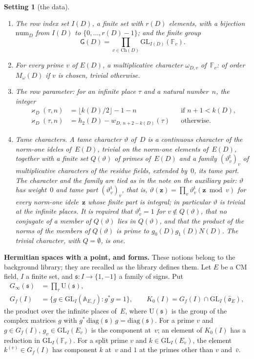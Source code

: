 \documentclass[11pt,a4paper]{article}
\newcommand{\F}{\mathbb{F}}
\newcommand{\m}[1]{\mbox{$#1$}}        %
\newcommand{\subhead}[1]{\par\addvspace{9pt plus 2pt}\Needspace{4\baselineskip}\noindent\textbf{#1}\enspace\ignorespaces}
\theoremstyle{plainx}
\theoremstyle{uprightx}
\newtheorem{setting}[theorem]{Setting}          %
\newcommand{\fs}{{\mathfrak s}}
\newcommand{\sG}{{\mathsf G}}
\newcommand{\Ch}{\mathrm{Ch}}
\newcommand{\GL}{\mathrm{GL}}
\newcommand{\num}{\mathrm{num}}
\begin{document}
\begin{setting}[the data]
\begin{enumerate}[label=\textup{(\roman*)},leftmargin=2.3em,itemsep=2pt]
\m{\#\F_v-1} is divisible by~$9$ and by \m{M_\omega(D)^2}, and \m{M_\omega(D)+1<\#\F_v}.
\item The \emph{row index set} $I(D)$, a finite set with $r(D)$ elements, with a bijection $\num_D$ from $I(D)$
to \m{\{0,\dots,r(D)-1\}}; and the finite group
\[\sG(D)=\prod_{v\in\Ch(D)}\GL_{I(D)}(\F_v).\]
\item For every prime $v$ of $E(D)$, a multiplicative character $\omega_{D,v}$ of~$\F_v$: of order
\m{M_\omega(D)} if $v$ is chosen, trivial otherwise.
\item The \emph{row parameter}: for an infinite place $\tau$ and a natural number~$n$, the integer
\begin{align*}
\varkappa_D(\tau,n)&=\lfloor k(D)/2\rfloor-1-n&&\text{if }n+1<k(D),\\
\varkappa_D(\tau,n)&=h_2(D)-w_{D,\,n+2-k(D)}(\tau)&&\text{otherwise.}
\end{align*}
\item \emph{Tame characters.} A tame character $\vartheta$ of~$D$ is a continuous character of the norm-one ideles
of~$E(D)$, trivial on the norm-one elements of~$E(D)$, together with a finite set $Q(\vartheta)$ of primes
of~$E(D)$ and a family \m{(\vartheta^{\mathrm{t}}_{v})_v} of multiplicative characters of the residue fields, extended
by~$0$, its \emph{tame part}. The character and the family are tied as in the note on the auxiliary pair:
$\vartheta$ has weight~$0$ and tame part \m{(\vartheta^{\mathrm{t}}_{v})_v}, that is,
\m{\vartheta(\mathbf{z})=\prod_v\vartheta^{\mathrm{t}}_{v}(\mathbf{z}\bmod v)} for every norm-one idele~$\mathbf{z}$ whose finite part is integral; in
particular $\vartheta$ is trivial at the infinite places. It is required that \m{\vartheta^{\mathrm{t}}_{v}=1} for
\m{v\notin Q(\vartheta)}, that no conjugate of a member of $Q(\vartheta)$ lies in $Q(\vartheta)$, and that the
product of the norms of the members of $Q(\vartheta)$ is prime to \m{g_0(D)g_1(D)N(D)}. The trivial character,
with \m{Q=\emptyset}, is one.
\end{enumerate}
\end{setting}

\subhead{Hermitian spaces with a point, and forms.} These notions belong to the background library; they are
recalled as the library defines them. Let $E$ be a CM field, $I$ a finite set, and \m{\fs\colon I\to\{1,-1\}} a
family of signs. Put
\begin{align*}
G_\infty(\fs)&=\prod_\tau\mathrm U(\fs),\\
G_f(I)&=\{g\in\GL_I(\mathbb A_{E,f}):g^*g=1\},\qquad K_0(I)=G_f(I)\cap\GL_I(\hat{\mathfrak{o}}_E),
\end{align*}
the product over the infinite places of~$E$, where \m{\mathrm U(\fs)} is the group of the complex matrices $g$
with \m{g^*\,\mathrm{diag}(\fs)\,g=\mathrm{diag}(\fs)}. For a prime $v$ and \m{g\in G_f(I)}, \m{g_v\in\GL_I(E_v)} is
the component at~$v$; an element of $K_0(I)$ has a reduction in \m{\GL_I(\F_v)}. For a split prime $v$ and
\m{k\in\GL_I(E_v)}, the element \m{k^{(v)}\in G_f(I)} has component $k$ at~$v$ and $1$ at the primes other than
$v$ and~$\bar v$.
\end{document}
